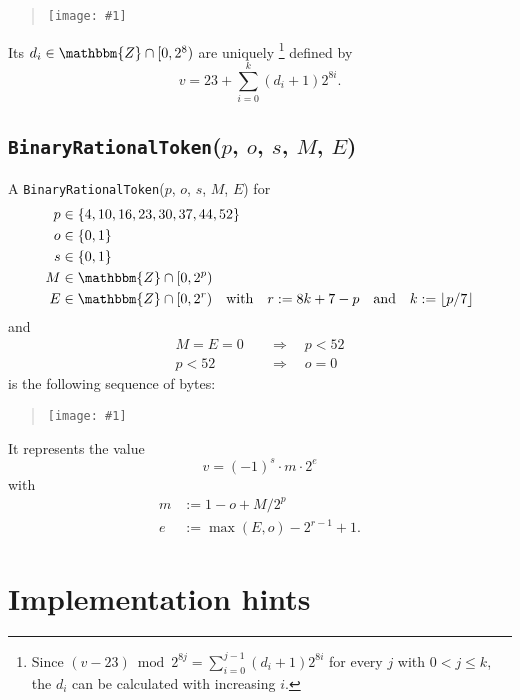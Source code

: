 \documentclass{dbor-article}
\newcommand{\SetOfIntegers}{\mathbbm{Z}}
\newcommand{\DborSyntaxIdent}[1]{\texttt{#1}}
\newcommand{\IncludeImageInPlace}[1]{%
        \begin{quotation}%
            \texttt{[image: \#1]}%
        \end{quotation}%
    }
\begin{document}
    \IncludeImageInPlace{IntegerTokenB.pdf}

    Its $d_i \in \SetOfIntegers \cap [0, 2^8)$ are uniquely%
    \footnote{%
        Since $(v - 23) \bmod 2^{8 j} = \sum_{i = 0}^{j - 1} (d_i + 1) 2^{8 i}$ for every $j$ with $0 < j \le k$,
        the $d_i$ can be calculated with increasing $i$.
    }
    defined by 
    \begin{equation}
        v = 23 + \sum_{i = 0}^k (d_i + 1) 2^{8 i}.
    \end{equation}

    
    \subsection{\DborSyntaxIdent{BinaryRationalToken}($p$, $o$, $s$, $M$, $E$)}
    \hypertarget{sec:def:BinaryRationalToken}{}

    A \DborSyntaxIdent{BinaryRationalToken}($p$, $o$, $s$, $M$, $E$) for
    \begin{align*}
        p & \in \{4, 10, 16, 23, 30, 37, 44, 52\} \\
        o & \in \{0, 1\} \\
        s & \in \{0, 1\} \\
        M & \in \SetOfIntegers \cap [0, 2^p) \\
        E & \in \SetOfIntegers \cap [0, 2^r)
            \quad\text{with}\quad r := 8 k + 7 - p
            \quad\text{and}\quad k := \lfloor p / 7 \rfloor
    \end{align*}%
    and
    \begin{align*}
        M = E = 0 \quad & \Rightarrow \quad p < 52 \\
        p < 52 \quad & \Rightarrow \quad o = 0
    \end{align*}%
    is the following sequence of bytes:

    \IncludeImageInPlace{BinaryRationalToken.pdf}

    It represents the value
    \begin{equation}
        v = (-1)^s \cdot m \cdot 2^e
    \end{equation}
    with
    \begin{align*}
        m & := 1 - o + M / 2^p \\
        e & := \max(E, o) - 2^{r-1} + 1.
    \end{align*}

    \section{Implementation hints}
    \label{sec:implementation}
\end{document}

